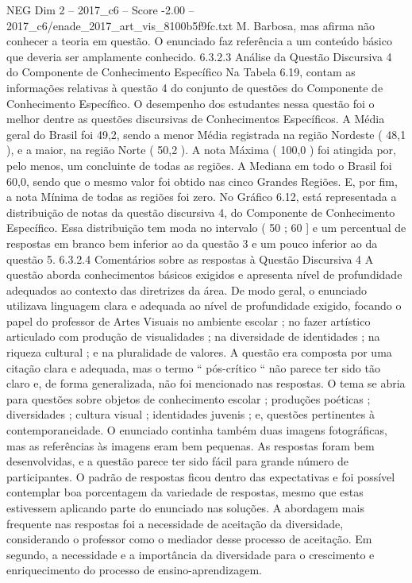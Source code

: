 \begin{textsample}{NEG Dim 2 – 2017\_c6 – Score -2.00 – 2017\_c6/enade\_2017\_art\_vis\_8100b5f9fc.txt}
M.
Barbosa, mas afirma não conhecer a teoria em questão.
O enunciado faz referência a um conteúdo básico que deveria ser amplamente conhecido. 6.3.2.3 Análise da Questão Discursiva 4 do Componente de Conhecimento Específico Na Tabela 6.19, contam as informações relativas à questão 4 do conjunto de questões do Componente de Conhecimento Específico.
O desempenho dos estudantes nessa questão foi o melhor dentre as questões discursivas de Conhecimentos Específicos.
A Média geral do Brasil foi 49,2, sendo a menor Média registrada na região Nordeste ( 48,1 ), e a maior, na região Norte ( 50,2 ).
A nota Máxima ( 100,0 ) foi atingida por, pelo menos, um concluinte de todas as regiões.
A Mediana em todo o Brasil foi 60,0, sendo que o mesmo valor foi obtido nas cinco Grandes Regiões.
E, por fim, a nota Mínima de todas as regiões foi zero.
No Gráfico 6.12, está representada a distribuição de notas da questão discursiva 4, do Componente de Conhecimento Específico.
Essa distribuição tem moda no intervalo ( 50 ; 60 ] e um percentual de respostas em branco bem inferior ao da questão 3 e um pouco inferior ao da questão 5. 6.3.2.4 Comentários sobre as respostas à Questão Discursiva 4 A questão aborda conhecimentos básicos exigidos e apresenta nível de profundidade adequados ao contexto das diretrizes da área.
De modo geral, o enunciado utilizava linguagem clara e adequada ao nível de profundidade exigido, focando o papel do professor de Artes Visuais no ambiente escolar ; no fazer artístico articulado com produção de visualidades ; na diversidade de identidades ; na riqueza cultural ; e na pluralidade de valores.
A questão era composta por uma citação clara e adequada, mas o termo “ pós-crítico “ não parece ter sido tão claro e, de forma generalizada, não foi mencionado nas respostas.
O tema se abria para questões sobre objetos de conhecimento escolar ; produções poéticas ; diversidades ; cultura visual ; identidades juvenis ; e, questões pertinentes à contemporaneidade.
O enunciado continha também duas imagens fotográficas, mas as referências às imagens eram bem pequenas.
As respostas foram bem desenvolvidas, e a questão parece ter sido fácil para grande número de participantes.
O padrão de respostas ficou dentro das expectativas e foi possível contemplar boa porcentagem da variedade de respostas, mesmo que estas estivessem aplicando parte do enunciado nas soluções.
A abordagem mais frequente nas respostas foi a necessidade de aceitação da diversidade, considerando o professor como o mediador desse processo de aceitação.
Em segundo, a necessidade e a importância da diversidade para o crescimento e enriquecimento do processo de ensino-aprendizagem.

\end{textsample}
